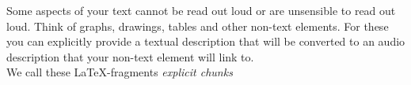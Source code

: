 Some aspects of your text cannot be read out loud or are
  unsensible to read out loud. Think of graphs, drawings, tables
  and other non-text elements. For these you can explicitly provide
  a textual description that will be converted to
  an audio description that your non-text element will link to.\\
  We call these \LaTeX-fragments \emph{explicit chunks}
